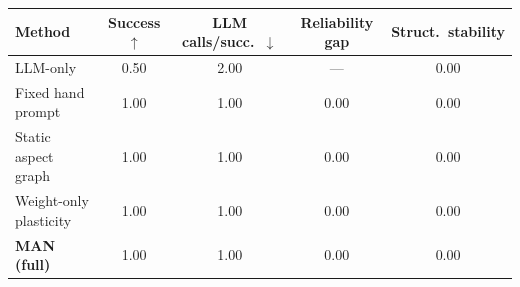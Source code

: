 \begin{center}
\begin{tabular}{@{}lcccc@{}}
\toprule
Method & Success $\uparrow$ & LLM calls/succ.\ $\downarrow$ & Reliability gap & Struct.\ stability \\
\midrule
LLM-only & 0.50 & 2.00 & --- & 0.00 \\
Fixed hand prompt & 1.00 & 1.00 & 0.00 & 0.00 \\
Static aspect graph & 1.00 & 1.00 & 0.00 & 0.00 \\
Weight-only plasticity & 1.00 & 1.00 & 0.00 & 0.00 \\
\textbf{MAN (full)} & 1.00 & 1.00 & 0.00 & 0.00 \\
\bottomrule
\end{tabular}
\end{center}